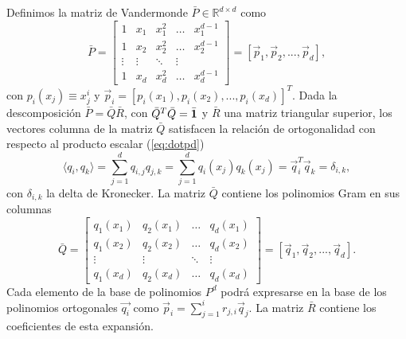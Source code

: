  Definimos la matriz de Vandermonde $\bar{P}\in\mathbb{R}^{d \times d}$ como
 \begin{equation}
\bar{P}=
\begin{bmatrix}
    1  & x_{1} & x_{1}^2 & \dots  & x_{1}^{d-1} \\
    1  & x_{2} & x_{2}^2 & \dots  & x_{2}^{d-1} \\
    \vdots  & \vdots & \ddots & \vdots \\
    1 & x_{d} & x_{d}^2 & \dots  & x_{d}^{d-1}
\end{bmatrix}
=[\vec{p}_1,\vec{p}_2,...,\vec{p}_{d}],
\label{eq:Vandermonde}
\end{equation}
con $p_i(x_j)\equiv x_j^i$ y $\vec{p}_i=[p_i(x_1),p_i(x_2),...,p_i(x_{d})]^T$. 
Dada la descomposición $\bar{P}=\bar{Q}\bar{R}$, con $\bar{Q}^T\bar{Q}= \bar{\mathbf{1}}$ y $\bar{R}$ una matriz triangular superior, los vectores columna 
de la matriz $\bar{Q}$ satisfacen la relación de ortogonalidad con respecto al producto escalar 
(\ref{eq:dotpd}) 
\begin{equation*}
\displaystyle \langle q_i,q_k \rangle = \sum_{j=1}^{d}q_{i,j}q_{j,k}=\sum_{j=1}^{d}q_i(x_j)q_k(x_j)=\vec{q}_i^T\vec{q}_k=\delta_{i,k} ,
\end{equation*}
con $\delta_{i,k}$ la delta de 
Kronecker. 
La matriz $\bar{Q}$ contiene los polinomios Gram en sus columnas
\begin{equation}
\bar{Q}=
\begin{bmatrix}
    q_1(x_1) & q_2(x_1) & \dots  & q_{d}(x_1) \\
    q_1(x_2) & q_2(x_2) & \dots  & q_{d}(x_2) \\
    \vdots &  \vdots & \ddots & \vdots \\
    q_1(x_{d}) & q_2(x_{d}) & \dots  &q_{d}(x_{d})
\end{bmatrix}=[\vec{q}_1,\vec{q}_2,...,\vec{q}_{d}].
\label{eq:VandermondeQR}
\end{equation}
Cada elemento de la base de polinomios $P^d$ podrá expresarse en la base de los polinomios ortogonales $\vec{q_i}$ como $\displaystyle \vec{p}_i=\sum_{j=1}^{i}r_{j,i}\vec{q}_j$. La matriz $\bar{R}$ contiene los coeficientes de esta expansión.

